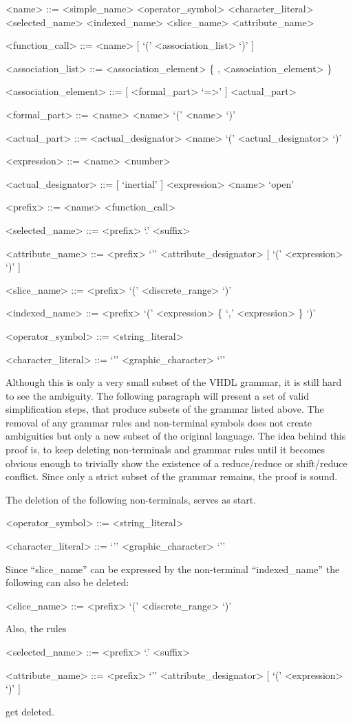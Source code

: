 \begin{grammar}
<name> ::=
  <simple_name> \alt <operator_symbol>
\alt <character_literal> \alt <selected_name>
\alt <indexed_name> \alt <slice_name>
\alt <attribute_name>

<function_call> ::=
<name> [ `(' <association_list> `)' ]

<association_list> ::=
<association_element> \{ , <association_element> \}

<association_element> ::=
[ <formal_part> `=>' ] <actual_part>

<formal_part> ::=
  <name>
\alt <name> `(' <name> `)'

<actual_part> ::=
  <actual_designator>
\alt <name> `(' <actual_designator> `)'

<expression> ::= <name> \alt <number>

<actual_designator> ::=
[ `inertial' ] <expression>
\alt <name>
\alt `open'

<prefix> ::= <name> \alt <function_call>

<selected_name> ::= <prefix> `.' <suffix>

<attribute_name> ::= <prefix> `'' <attribute_designator> [ `(' <expression> `)' ]

<slice_name> ::= <prefix> `(' <discrete_range> `)'

<indexed_name> ::= <prefix> `(' <expression> \{ `,' <expression> \} `)'

<operator_symbol> ::= <string_literal>

<character_literal> ::= `'' <graphic_character> `''
\end{grammar}
%
Although this is only a very small subset of the VHDL grammar, it is
still hard to see the ambiguity. The following paragraph will present
a set of valid simplification steps, that produce subsets of the
grammar listed above.
The removal of any grammar rules and
non-terminal symbols does not create ambiguities but
only a new subset of the original language.
The idea behind this proof is, to keep deleting non-terminals and
grammar rules until it becomes obvious enough to trivially show the
existence of
a reduce/reduce or shift/reduce conflict. Since only a
strict subset of the grammar remains, the proof is sound.

The deletion of the following non-terminals, serves as start.
\begin{grammar}
<operator_symbol> ::= <string_literal>

<character_literal> ::= `'' <graphic_character> `''
\end{grammar}
%
Since ``slice_name'' can be expressed by the non-terminal
``indexed_name'' the following can also be deleted:
%
\begin{grammar}
<slice_name> ::= <prefix> `(' <discrete_range> `)'
\end{grammar}
%
Also, the rules
\begin{grammar}
<selected_name> ::= <prefix> `.' <suffix>

<attribute_name> ::= <prefix> `'' <attribute_designator> [ `(' <expression> `)' ]
\end{grammar}
get deleted.

